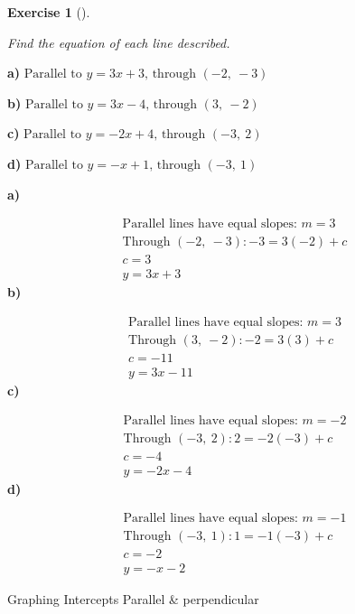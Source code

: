 \documentclass[
  letterpaper,
  DIV=11,
  numbers=noendperiod]{scrreprt}
\theoremstyle{definition}
\newtheorem{exercise}{Exercise}[chapter]
\theoremstyle{remark}
\begin{document}
\begin{exercise}[]\protect\hypertarget{exr-u7-15}{}\label{exr-u7-15}

\emph{Find the equation of each line described.}

\textbf{a)}
\(\displaystyle \text{Parallel to } y = 3x + 3\text{, through } (-2,\ -3)\)

\textbf{b)}
\(\displaystyle \text{Parallel to } y = 3x - 4\text{, through } (3,\ -2)\)

\textbf{c)}
\(\displaystyle \text{Parallel to } y = -2x + 4\text{, through } (-3,\ 2)\)

\textbf{d)}
\(\displaystyle \text{Parallel to } y = -x + 1\text{, through } (-3,\ 1)\)

\begin{tcolorbox}[enhanced jigsaw, opacitybacktitle=0.6, coltitle=black, arc=.35mm, colframe=quarto-callout-tip-color-frame, colback=white, bottomrule=.15mm, left=2mm, colbacktitle=quarto-callout-tip-color!10!white, titlerule=0mm, opacityback=0, title=\textcolor{quarto-callout-tip-color}{\faLightbulb}\hspace{0.5em}{🔍 View Solutions}, leftrule=.75mm, breakable, rightrule=.15mm, bottomtitle=1mm, toptitle=1mm, toprule=.15mm]

\textbf{a)}

\[
\begin{aligned}
\text{Parallel lines have equal slopes: } m = 3 \\[4pt] \text{Through }(-2,\ -3): -3 = 3(-2) + c \\[4pt] c = 3 \\[4pt] y = 3x + 3
\end{aligned}
\] \textbf{b)}

\[
\begin{aligned}
\text{Parallel lines have equal slopes: } m = 3 \\[4pt] \text{Through }(3,\ -2): -2 = 3(3) + c \\[4pt] c = -11 \\[4pt] y = 3x - 11
\end{aligned}
\] \textbf{c)}

\[
\begin{aligned}
\text{Parallel lines have equal slopes: } m = -2 \\[4pt] \text{Through }(-3,\ 2): 2 = -2(-3) + c \\[4pt] c = -4 \\[4pt] y = -2x - 4
\end{aligned}
\] \textbf{d)}

\[
\begin{aligned}
\text{Parallel lines have equal slopes: } m = -1 \\[4pt] \text{Through }(-3,\ 1): 1 = -1(-3) + c \\[4pt] c = -2 \\[4pt] y = -x - 2
\end{aligned}
\]

\end{tcolorbox}

{Graphing} {Intercepts} {Parallel \& perpendicular}

\end{exercise}
\end{document}

